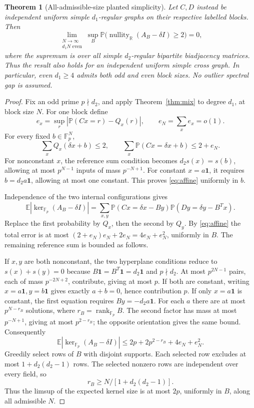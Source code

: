 \documentclass[11pt]{article}
\newtheorem{theorem}{Theorem}
\newcommand{\Fp}{\mathbb F_p}
\newcommand{\R}{\mathbb R}
\newcommand{\one}{\mathbf1}
\newcommand{\Prob}{\mathbb P}
\newcommand{\E}{\mathbb E}
\newcommand{\nullity}{\operatorname{nullity}}
\newcommand{\rank}{\operatorname{rank}}
\begin{document}
\begin{theorem}[All-admissible-size planted simplicity]\label{thm:rsbm}
Let $C,D$ instead be independent uniform \emph{simple}
$d_1$-regular graphs on their respective labelled blocks. Then
\[
 \lim_{\substack{N\to\infty\\d_1N\text{ even}}}
 \sup_{B}\Prob\bigl(\nullity_{\R}(A_B-\delta I)\ge2\bigr)=0,
\]
where the supremum is over all simple $d_2$-regular bipartite
biadjacency matrices. Thus the result also holds for an independent
uniform simple cross graph. In particular, even $d_1\ge4$ admits
\emph{both} odd and even block sizes. No outlier spectral gap is
assumed.
\end{theorem}

\begin{proof}
Fix an odd prime $p\nmid d_2$, and apply
Theorem~\ref{thm:mix} to degree $d_1$, at block size $N$.
For one block define
\[
 e_x=\sup_r|\Prob(Cx=r)-Q_x(r)|,\qquad
 e_N=\sum_xe_x=o(1).
\]
For every fixed $b\in\Fp^N$,
\begin{equation}\label{eq:affine}
 \sum_xQ_x(\delta x+b)\le2,
 \qquad \sum_x\Prob(Cx=\delta x+b)\le2+e_N.
\end{equation}
For nonconstant $x$, the reference sum condition becomes
$d_2s(x)=s(b)$, allowing at most $p^{N-1}$ inputs of mass
$p^{-N+1}$. For constant $x=a\one$, it requires
$b=d_2a\one$, allowing at most one constant. This proves
\eqref{eq:affine} uniformly in $b$.

Independence of the two internal configurations gives
\[
 \E|\ker_{\Fp}(A_B-\delta I)|
 =\sum_{x,y}\Prob(Cx=\delta x-By)
                \Prob(Dy=\delta y-B^Tx).
\]
Replace the first probability by $Q_x$, then the second by $Q_y$.
By \eqref{eq:affine} the total error is at most
$(2+e_N)e_N+2e_N=4e_N+e_N^2$, uniformly in $B$.
The remaining reference sum is bounded as follows.

If $x,y$ are both nonconstant, the two hyperplane conditions reduce
to $s(x)+s(y)=0$ because $B\one=B^T\one=d_2\one$ and
$p\nmid d_2$. At most $p^{2N-1}$ pairs, each of mass
$p^{-2N+2}$, contribute, giving at most $p$.
If both are constant, writing $x=a\one,y=b\one$ gives exactly
$a+b=0$, hence contribution $p$.
If only $x=a\one$ is constant, the first equation requires
$By=-d_2a\one$. For each $a$ there are at most
$p^{N-r_B}$ solutions, where $r_B=\rank_{\Fp}B$.
The second factor has mass at most $p^{-N+1}$, giving at most
$p^{2-r_B}$; the opposite orientation gives the same bound.
Consequently
\[
 \E|\ker_{\Fp}(A_B-\delta I)|
 \le2p+2p^{2-r_B}+4e_N+e_N^2.
\]
Greedily select rows of $B$ with disjoint supports. Each selected
row excludes at most $1+d_2(d_2-1)$ rows. The selected nonzero rows
are independent over every field, so
\[
 r_B\ge N/[1+d_2(d_2-1)].
\]
Thus the limsup of the expected kernel size is at most $2p$,
uniformly in $B$, along all admissible $N$.


\end{proof}
\end{document}
